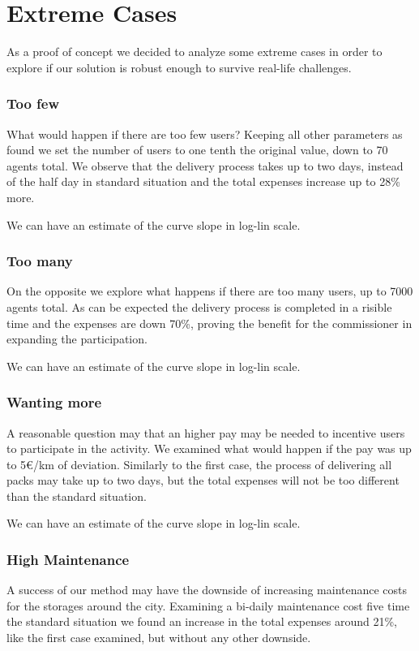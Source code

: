 \documentclass[11pt,a4paper]{article}
\begin{document}
\newpage
\section{Extreme Cases}
As a proof of concept we decided to analyze some extreme cases in order to explore if our solution is robust enough to survive real-life challenges.

\subsubsection*{Too few}
What would happen if there are too few users? 
Keeping all other parameters as found we set the number of users to one tenth the original value, down to 70 agents total.
We observe that the delivery process takes up to two days, instead of the half day in standard situation and the total expenses increase up to 28\% more.



We can have an estimate of the curve slope in log-lin scale.



\newpage
\subsubsection*{Too many}
On the opposite we explore what happens if there are too many users, up to 7000 agents total.
As can be expected the delivery process is completed in a risible time and the expenses are down 70\%, proving the benefit for the commissioner in expanding the participation.


We can have an estimate of the curve slope in log-lin scale.



\newpage
\subsubsection*{Wanting more}
A reasonable question may that an higher pay may be needed to incentive users to participate in the activity. 
We examined what would happen if the pay was up to 5\euro{}/km of deviation.
Similarly to the first case, the process of delivering all packs may take up to two days, but the total expenses will not be too different than the standard situation.


We can have an estimate of the curve slope in log-lin scale.



\newpage
\subsubsection*{High Maintenance}
A success of our method may have the downside of increasing maintenance costs for the storages around the city.
Examining a bi-daily maintenance cost five time the standard situation we found an increase in the total expenses around 21\%, like the first case examined, but without any other downside.
\end{document}
